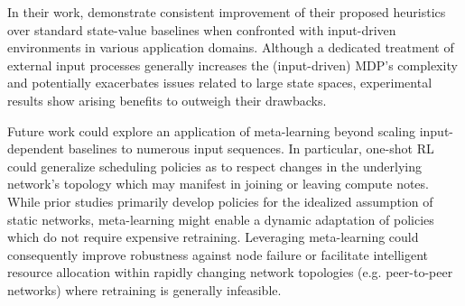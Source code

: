 In their work, \citeauthor{mao2018variance} demonstrate consistent improvement of their proposed heuristics over  standard state-value baselines when confronted with input-driven environments in various application domains. Although a dedicated treatment of external input processes generally increases the (input-driven) MDP's complexity and potentially exacerbates issues related to large state spaces, experimental results show arising benefits to outweigh their drawbacks. 

Future work could explore an application of meta-learning beyond scaling input-dependent baselines to numerous input sequences. In particular, one-shot RL could generalize scheduling policies as to respect changes in the underlying network's topology which may manifest in joining or leaving compute notes. While prior studies primarily develop policies for the idealized assumption of static networks, meta-learning might enable a dynamic adaptation of policies which do not require expensive retraining. Leveraging meta-learning could consequently improve robustness against node failure or facilitate intelligent resource allocation within rapidly changing network topologies (e.g. peer-to-peer networks) where retraining is generally infeasible.






